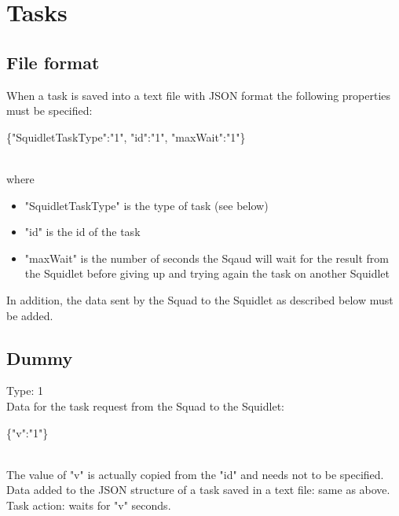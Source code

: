 \section{Tasks}

\subsection{File format}

When a task is saved into a text file with JSON format the following properties must be specified:\\
\begin{ttfamily}\{"SquidletTaskType":"1", "id":"1", "maxWait":"1"\}\end{ttfamily}\\
where
\begin{itemize}
\item "SquidletTaskType" is the type of task (see below)
\item "id" is the id of the task
\item "maxWait" is the number of seconds the Sqaud will wait for the result from the Squidlet before giving up and trying again the task on another Squidlet
\end{itemize}
In addition, the data sent by the Squad to the Squidlet as described below must be added.
 
\subsection{Dummy}

Type: 1\\

Data for the task request from the Squad to the Squidlet:\\
\begin{ttfamily}\{"v":"1"\}\end{ttfamily}\\
The value of "v" is actually copied from the "id" and needs not to be specified.\\

Data added to the JSON structure of a task saved in a text file: same as above.\\

Task action: waits for "v" seconds.\\

